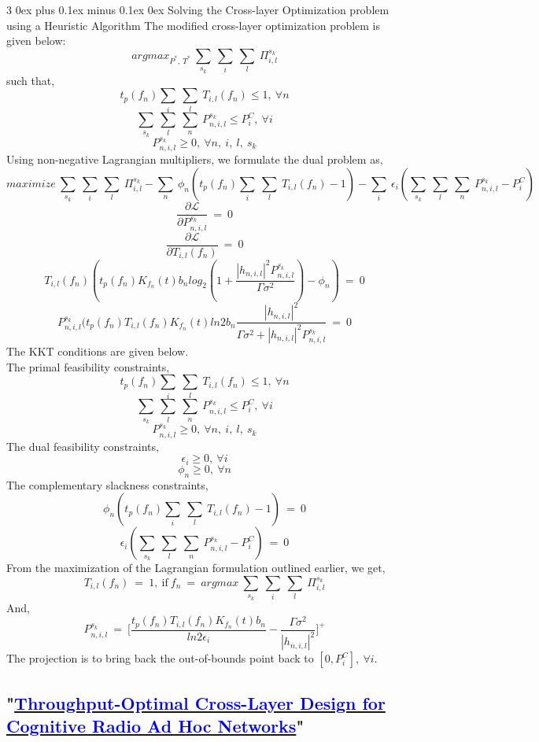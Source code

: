 \documentclass[12pt, draftcls, onecolumn]{IEEEtran}
\makeatletter
\def\subsubsection{\@startsection{subsubsection}%
                                 {3}%
                                 {\z@}%
                                 {0ex plus 0.1ex minus 0.1ex}%
                                 {0ex}%
                                 {\normalfont\normalsize\bfseries}}%
\makeatother
\begin{document}
\subsubsection{Solving the Cross-layer Optimization problem using a Heuristic Algorithm}
The modified cross-layer optimization problem is given below:
\[argmax_{P^*,\ T^*}\ \sum_{s_k}\ \sum_{i}\ \sum_{l}\ \Pi_{i,l}^{s_k}\]
such that,
\[t_p(f_n)\sum_i\ \sum_l\ T_{i,l}(f_n) \leq 1,\ \forall n\]
\[\sum_{s_k}\ \sum_{l}\ \sum_{n}\ P_{n,i,l}^{s_k} \leq P_i^C,\ \forall i\]
\[P_{n,i,l}^{s_k} \geq 0,\ \forall n,\ i,\ l,\ s_k\]
Using non-negative Lagrangian multipliers, we formulate the dual problem as,
\[maximize\ \sum_{s_k}\ \sum_{i}\ \sum_{l}\ \Pi_{i,l}^{s_k} - \sum_{n}\ \phi_n(t_p(f_n)\sum_i\ \sum_l\ T_{i,l}(f_n) - 1) - \sum_i\ \epsilon_i(\sum_{s_k}\ \sum_{l}\ \sum_{n}\ P_{n,i,l}^{s_k} - P_i^C)\]
\[\frac{\partial \mathcal{L}}{\partial P_{n,i,l}^{s_k}}\ =\ 0\]
\[\frac{\partial \mathcal{L}}{\partial T_{i,l}(f_n)}\ =\ 0\]
\[T_{i,l}(f_n)(t_p(f_n)K_{f_n}(t) b_n log_2(1+\frac{|h_{n,i,l}|^2 P_{n,i,l}^{s_k}}{\Gamma \sigma^2}) - \phi_n)\ =\ 0\]
\[P_{n,i,l}^{s_k}(t_p(f_n)T_{i,l}(f_n)K_{f_n}(t)ln 2 b_n \frac{|h_{n,i,l}|^2}{\Gamma \sigma^2 + |h_{n,i,l}|^2P_{n,i,l}^{s_k}}\ =\ 0\]
The KKT conditions are given below.
\\The primal feasibility constraints,
\[t_p(f_n)\sum_i\ \sum_l\ T_{i,l}(f_n) \leq 1,\ \forall n\]
\[\sum_{s_k}\ \sum_{l}\ \sum_{n}\ P_{n,i,l}^{s_k} \leq P_i^C,\ \forall i\]
\[P_{n,i,l}^{s_k} \geq 0,\ \forall n,\ i,\ l,\ s_k\]
The dual feasibility constraints,
\[\epsilon_i \geq 0,\ \forall i\]
\[\phi_n \geq 0,\ \forall n\]
The complementary slackness constraints,
\[\phi_n(t_p(f_n)\sum_i\ \sum_l\ T_{i,l}(f_n) - 1)\ =\ 0\]
\[\epsilon_i(\sum_{s_k}\ \sum_l\ \sum_n\ P_{n,i,l}^{s_k} - P_i^C)\ =\ 0\]
From the maximization of the Lagrangian formulation outlined earlier, we get,
\[T_{i,l}(f_n)\ =\ 1,\ \text{if}\ f_n\ =\ argmax\ \sum_{s_k}\ \sum_i\ \sum_l\ \Pi_{i,l}^{s_k}\]
And,
\[P_{n,i,l}^{s_k}\ =\ \Big[\frac{t_p(f_n)T_{i,l}(f_n)K_{f_n}(t)b_n}{ln2 \epsilon_i} - \frac{\Gamma \sigma^2}{|h_{n,i,l}|^2}\Big]^+\]
The projection is to bring back the out-of-bounds point back to $[0, P_{i}^C],\ \forall i$.
\subsection{"\href{http://ieeexplore.ieee.org/stamp/stamp.jsp?tp=&arnumber=6881740&isnumber=7180482}{\textcolor{blue}{Throughput-Optimal Cross-Layer Design for Cognitive Radio Ad Hoc Networks}}"}
\end{document}
